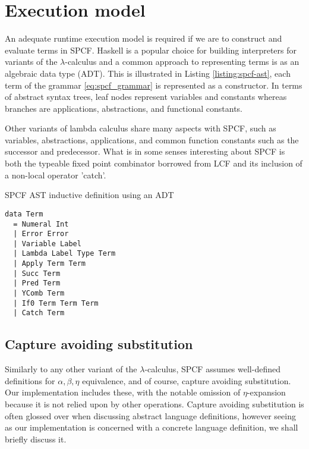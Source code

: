 \documentclass[12pt,a4paper]{report}
\theoremstyle{definition}
\theoremstyle{remark}
\begin{document}
\section{Execution model}\label{section: language representation}
An adequate runtime execution model is required if we are to construct and evaluate terms in SPCF. Haskell is a popular choice for building interpreters for variants of the $\lambda$-calculus and a common approach to representing terms is as an algebraic data type (ADT). This is illustrated in Listing \ref{listing:spcf-ast}, each term of the grammar \eqref{eq:spcf_grammar} is represented as a constructor. In terms of abstract syntax trees, leaf nodes represent variables and constants whereas branches are applications, abstractions, and functional constants. 

Other variants of lambda calculus share many aspects with SPCF, such as variables, abstractions, applications, and common function constants such as the successor and predecessor. What is in some senses interesting about SPCF is both the typeable fixed point combinator borrowed from LCF and its inclusion of a non-local operator 'catch'. 

\begin{listing}
\caption{SPCF AST inductive definition using an ADT}
\begin{verbatim}
data Term
  = Numeral Int
  | Error Error
  | Variable Label
  | Lambda Label Type Term
  | Apply Term Term 
  | Succ Term
  | Pred Term
  | YComb Term
  | If0 Term Term Term
  | Catch Term
\end{verbatim}
\label{listing:spcf-ast}
\end{listing}

\subsection{Capture avoiding substitution}
Similarly to any other variant of the $\lambda$-calculus, SPCF assumes well-defined definitions for $\alpha, \beta, \eta$ equivalence, and of course, capture avoiding substitution. Our implementation includes these, with the notable omission of $\eta$-expansion because it is not relied upon by other operations. Capture avoiding substitution is often glossed over when discussing abstract language definitions, however seeing as our implementation is concerned with a concrete language definition, we shall briefly discuss it.
\end{document}
